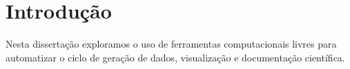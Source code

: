 \chapter{Introdução}
Nesta dissertação exploramos o uso de ferramentas computacionais livres para automatizar o ciclo de geração de dados, visualização e documentação científica.

